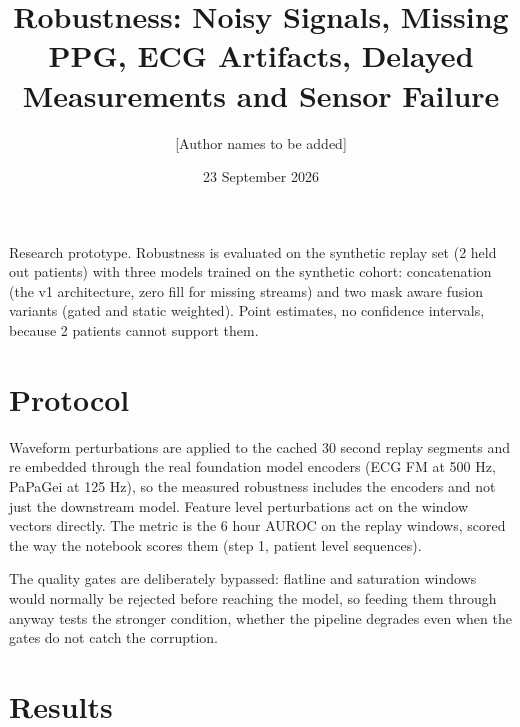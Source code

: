 \documentclass[11pt]{article}
\title{Robustness: Noisy Signals, Missing PPG, ECG Artifacts, Delayed
Measurements and Sensor Failure}
\author{[Author names to be added]}
\date{23 September 2026}
\begin{document}
\maketitle

\begin{center}
\small
Research prototype. Robustness is evaluated on the synthetic replay set
(2 held out patients) with three models trained on the synthetic cohort:
concatenation (the v1 architecture, zero fill for missing streams) and two
mask aware fusion variants (gated and static weighted). Point estimates, no
confidence intervals, because 2 patients cannot support them.
\end{center}

\section{Protocol}
Waveform perturbations are applied to the cached 30 second replay segments
and re embedded through the real foundation model encoders (ECG FM at 500 Hz,
PaPaGei at 125 Hz), so the measured robustness includes the encoders and not
just the downstream model. Feature level perturbations act on the window
vectors directly. The metric is the 6 hour AUROC on the replay windows,
scored the way the notebook scores them (step 1, patient level sequences).

The quality gates are deliberately bypassed: flatline and saturation windows
would normally be rejected before reaching the model, so feeding them through
anyway tests the stronger condition, whether the pipeline degrades even when
the gates do not catch the corruption.

\section{Results}
\end{document}
